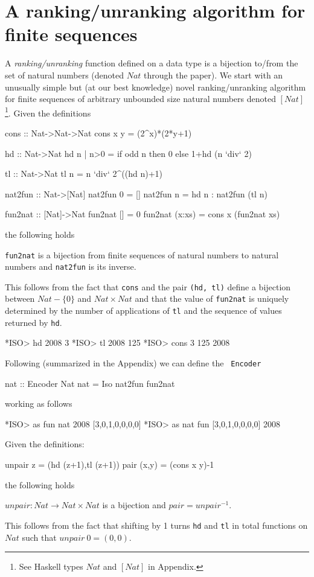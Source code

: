 \documentclass[]{INCLUDES/llncs}
\begin{document}
\section{A ranking/unranking algorithm for finite sequences}
A {\em ranking/unranking} function defined on a data type is a bijection to/from
the set of natural numbers (denoted $Nat$ through the paper). 
We start with an unusually simple but (at our best knowledge) novel
ranking/unranking algorithm for finite sequences of arbitrary 
unbounded size natural numbers denoted $[Nat]$\footnote{See Haskell types
$Nat$ and $[Nat]$ in Appendix.}. Given the definitions
\begin{code}
cons :: Nat->Nat->Nat
cons x y  = (2^x)*(2*y+1)

hd :: Nat->Nat
hd n | n>0 = if odd n then 0 else 1+hd  (n `div` 2)

tl :: Nat->Nat
tl n = n `div` 2^((hd n)+1)

nat2fun :: Nat->[Nat]
nat2fun 0 = []
nat2fun n = hd n : nat2fun (tl n)
 
fun2nat :: [Nat]->Nat  
fun2nat [] = 0
fun2nat (x:xs) = cons x (fun2nat xs)
\end{code}
the following holds
\begin{prop}
{\tt fun2nat} is a bijection from finite sequences of natural numbers to natural
numbers and {\tt nat2fun} is its inverse.
\end{prop}
This follows from the fact that {\tt cons} and the pair {\tt (hd, tl)} define a bijection between
$Nat-\{0\}$ and $Nat \times Nat$ and that the value of {\tt fun2nat} is uniquely
determined by the number of applications of {\tt tl} and the sequence of values
returned by {\tt hd}.
\begin{codex}
*ISO> hd 2008
3
*ISO> tl 2008
125
*ISO> cons 3 125
2008
\end{codex}

Following \cite{sac09fISO} (summarized in the Appendix) we can define the {\tt
Encoder}
\begin{code}
nat :: Encoder Nat
nat = Iso nat2fun fun2nat
\end{code}
working as follows
\begin{codex}
*ISO> as fun nat 2008
[3,0,1,0,0,0,0]
*ISO> as nat fun [3,0,1,0,0,0,0]
2008
\end{codex}

Given the definitions:
\begin{code}
unpair z = (hd (z+1),tl (z+1))
pair (x,y) = (cons x y)-1
\end{code}
the following holds
\begin{prop}
$unpair:Nat \rightarrow Nat \times Nat$ 
is a bijection and $pair=unpair^{-1}$.
\end{prop}
This follows from the fact that shifting by 1 turns {\tt hd} and {\tt tl} in
total functions on $Nat$ such that $unpair~0=(0,0)$.
\end{document}
